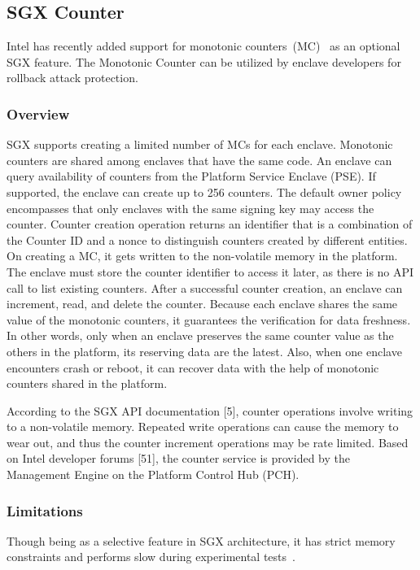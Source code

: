 \subsection{SGX Counter}

Intel has recently added support for monotonic counters~(MC)~\cite{} as an optional SGX feature. The Monotonic Counter can be utilized by enclave developers for rollback attack protection. 

\subsubsection{Overview}

SGX supports creating a limited number of MCs for each enclave. Monotonic counters are shared among enclaves that have the same code. An enclave can query availability of counters from the Platform Service Enclave (PSE). If supported, the enclave can create up to 256 counters. The default owner policy encompasses that only enclaves with the same signing key may access the counter. Counter creation operation returns an identifier that is a combination of the Counter ID and a nonce to distinguish counters created by different entities. On creating a MC, it gets written to the non-volatile memory in the platform. The enclave must store the counter identifier to access it later, as there is no API call to list existing counters. After a successful counter creation, an enclave can increment, read, and delete the counter. Because each enclave shares the same value of the monotonic counters, it guarantees the verification for data freshness. In other words, only when an enclave preserves the same counter value as the others in the platform, its reserving data are the latest. Also, when one enclave encounters crash or reboot, it can recover data with the help of monotonic counters shared in the platform. 

According to the SGX API documentation [5], counter operations involve writing to a non-volatile memory. Repeated write operations can cause the memory to wear out, and thus the counter increment operations may be rate limited. Based on Intel developer forums [51], the counter service is provided by the Management Engine on the Platform Control Hub (PCH).


\subsubsection{Limitations}
Though being as a selective feature in SGX architecture, it has strict memory constraints and performs slow during experimental tests~\cite{}. 

